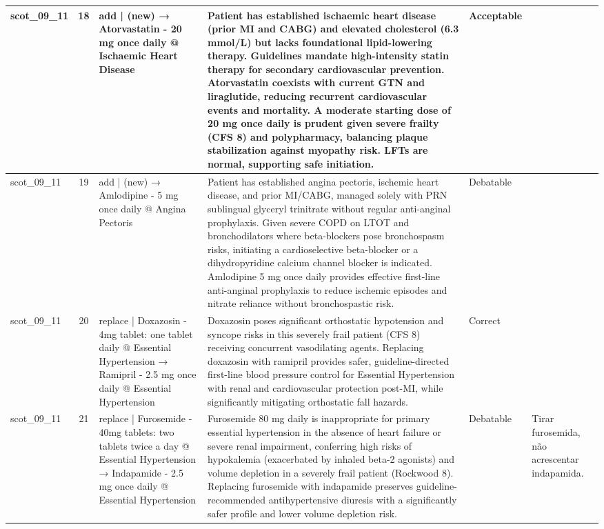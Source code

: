 \begin{longtable}{|p{1.45cm}|c|p{3.3cm}|p{6.5cm}|p{1.55cm}|p{2.3cm}|}
\hline
scot\_09\_11 & 18 & add | (new) → Atorvastatin - 20 mg once daily @ Ischaemic Heart Disease & Patient has established ischaemic heart disease (prior MI and CABG) and elevated cholesterol (6.3 mmol/L) but lacks foundational lipid-lowering therapy. Guidelines mandate high-intensity statin therapy for secondary cardiovascular prevention. Atorvastatin coexists with current GTN and liraglutide, reducing recurrent cardiovascular events and mortality. A moderate starting dose of 20 mg once daily is prudent given severe frailty (CFS 8) and polypharmacy, balancing plaque stabilization against myopathy risk. LFTs are normal, supporting safe initiation. & Acceptable &  \\
\hline
scot\_09\_11 & 19 & add | (new) → Amlodipine - 5 mg once daily @ Angina Pectoris & Patient has established angina pectoris, ischemic heart disease, and prior MI/CABG, managed solely with PRN sublingual glyceryl trinitrate without regular anti-anginal prophylaxis. Given severe COPD on LTOT and bronchodilators where beta-blockers pose bronchospasm risks, initiating a cardioselective beta-blocker or a dihydropyridine calcium channel blocker is indicated. Amlodipine 5 mg once daily provides effective first-line anti-anginal prophylaxis to reduce ischemic episodes and nitrate reliance without bronchospastic risk. & Debatable &  \\
\hline
scot\_09\_11 & 20 & replace | Doxazosin - 4mg tablet: one tablet daily @ Essential Hypertension → Ramipril - 2.5 mg once daily @ Essential Hypertension & Doxazosin poses significant orthostatic hypotension and syncope risks in this severely frail patient (CFS 8) receiving concurrent vasodilating agents. Replacing doxazosin with ramipril provides safer, guideline-directed first-line blood pressure control for Essential Hypertension with renal and cardiovascular protection post-MI, while significantly mitigating orthostatic fall hazards. & Correct &  \\
\hline
scot\_09\_11 & 21 & replace | Furosemide - 40mg tablets: two tablets twice a day @ Essential Hypertension → Indapamide - 2.5 mg once daily @ Essential Hypertension & Furosemide 80 mg daily is inappropriate for primary essential hypertension in the absence of heart failure or severe renal impairment, conferring high risks of hypokalemia (exacerbated by inhaled beta-2 agonists) and volume depletion in a severely frail patient (Rockwood 8). Replacing furosemide with indapamide preserves guideline-recommended antihypertensive diuresis with a significantly safer profile and lower volume depletion risk. & Debatable & Tirar furosemida, não acrescentar indapamida. \\

\end{longtable}
